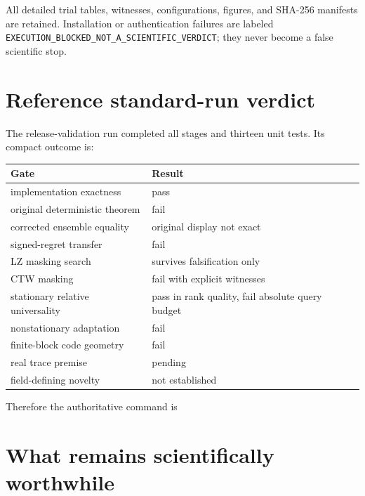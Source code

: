 \documentclass[11pt]{article}
\begin{document}
All detailed trial tables, witnesses, configurations, figures, and SHA-256 manifests are retained.  Installation or authentication failures are labeled \texttt{EXECUTION\_BLOCKED\_NOT\_A\_SCIENTIFIC\_VERDICT}; they never become a false scientific stop.

\section{Reference standard-run verdict}

The release-validation run completed all stages and thirteen unit tests.  Its compact outcome is:
\begin{center}
\begin{tabular}{@{}ll@{}}
\toprule
Gate & Result \\
\midrule
implementation exactness & pass \\
original deterministic theorem & fail \\
corrected ensemble equality & original display not exact \\
signed-regret transfer & fail \\
LZ masking search & survives falsification only \\
CTW masking & fail with explicit witnesses \\
stationary relative universality & pass in rank quality, fail absolute query budget \\
nonstationary adaptation & fail \\
finite-block code geometry & fail \\
real trace premise & pending \\
field-defining novelty & not established \\
\bottomrule
\end{tabular}
\end{center}

Therefore the authoritative command is
\begin{center}
\end{center}

\section{What remains scientifically worthwhile}
\end{document}
